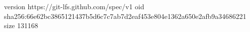 version https://git-lfs.github.com/spec/v1
oid sha256:66e62bc3865121437b5d6c7c7ab7d2eaf453e804e1362a650e2afb9a34686221
size 131168
